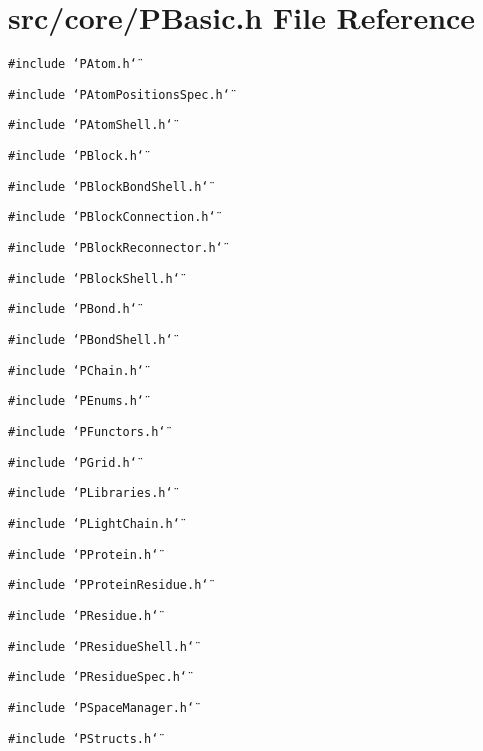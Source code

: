 \section{src/core/PBasic.h File Reference}
\label{PBasic_8h}


{\tt \#include \char`\"{}PAtom.h\char`\"{}}\par
{\tt \#include \char`\"{}PAtom\-Positions\-Spec.h\char`\"{}}\par
{\tt \#include \char`\"{}PAtom\-Shell.h\char`\"{}}\par
{\tt \#include \char`\"{}PBlock.h\char`\"{}}\par
{\tt \#include \char`\"{}PBlock\-Bond\-Shell.h\char`\"{}}\par
{\tt \#include \char`\"{}PBlock\-Connection.h\char`\"{}}\par
{\tt \#include \char`\"{}PBlock\-Reconnector.h\char`\"{}}\par
{\tt \#include \char`\"{}PBlock\-Shell.h\char`\"{}}\par
{\tt \#include \char`\"{}PBond.h\char`\"{}}\par
{\tt \#include \char`\"{}PBond\-Shell.h\char`\"{}}\par
{\tt \#include \char`\"{}PChain.h\char`\"{}}\par
{\tt \#include \char`\"{}PEnums.h\char`\"{}}\par
{\tt \#include \char`\"{}PFunctors.h\char`\"{}}\par
{\tt \#include \char`\"{}PGrid.h\char`\"{}}\par
{\tt \#include \char`\"{}PLibraries.h\char`\"{}}\par
{\tt \#include \char`\"{}PLight\-Chain.h\char`\"{}}\par
{\tt \#include \char`\"{}PProtein.h\char`\"{}}\par
{\tt \#include \char`\"{}PProtein\-Residue.h\char`\"{}}\par
{\tt \#include \char`\"{}PResidue.h\char`\"{}}\par
{\tt \#include \char`\"{}PResidue\-Shell.h\char`\"{}}\par
{\tt \#include \char`\"{}PResidue\-Spec.h\char`\"{}}\par
{\tt \#include \char`\"{}PSpace\-Manager.h\char`\"{}}\par
{\tt \#include \char`\"{}PStructs.h\char`\"{}}\par

